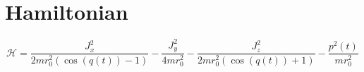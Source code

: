 \documentclass{article}%
\begin{document}
%
\normalsize%
\section*{Hamiltonian}%
\begin{dmath}%
\mathcal{H} = \frac{J_{x}^{2}}{2 m r_{0}^{2} \left(\cos{\left (q{\left (t \right )} \right )} - 1\right)} - \frac{J_{y}^{2}}{4 m r_{0}^{2}} - \frac{J_{z}^{2}}{2 m r_{0}^{2} \left(\cos{\left (q{\left (t \right )} \right )} + 1\right)} - \frac{p^{2}{\left (t \right )}}{m r_{0}^{2}}%
\end{dmath}

%
\end{document}
